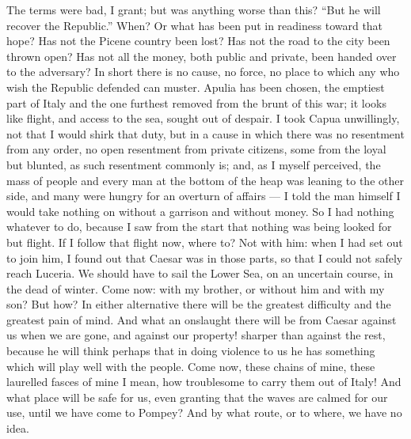  The terms were bad, I grant; but was anything worse than this? ``But he will recover the Republic.'' When? Or what has been put in readiness toward that hope? Has not the Picene country been lost? Has not the road to the city been thrown open? Has not all the money, both public and private, been handed over to the adversary? In short there is no cause, no force, no place to which any who wish the Republic defended can muster. Apulia has been chosen, the emptiest part of Italy and the one furthest removed from the brunt of this war; it looks like flight, and access to the sea, sought out of despair. I took Capua unwillingly, not that I would shirk that duty, but in a cause in which there was no resentment from any order, no open resentment from private citizens, some from the loyal but blunted, as such resentment commonly is; and, as I myself perceived, the mass of people and every man at the bottom of the heap was leaning to the other side, and many were hungry for an overturn of affairs --- I told the man himself I would take nothing on without a garrison and without money. So I had nothing whatever to do, because I saw from the start that nothing was being looked for but flight. If I follow that flight now, where to? Not with him: when I had set out to join him, I found out that Caesar was in those parts, so that I could not safely reach Luceria. We should have to sail the Lower Sea, on an uncertain course, in the dead of winter. Come now: with my brother, or without him and with my son? But how? In either alternative there will be the greatest difficulty and the greatest pain of mind. And what an onslaught there will be from Caesar against us when we are gone, and against our property! sharper than against the rest, because he will think perhaps that in doing violence to us he has something which will play well with the people. Come now, these chains of mine, these laurelled fasces of mine I mean, how troublesome to carry them out of Italy! And what place will be safe for us, even granting that the waves are calmed for our use, until we have come to Pompey? And by what route, or to where, we have no idea.

